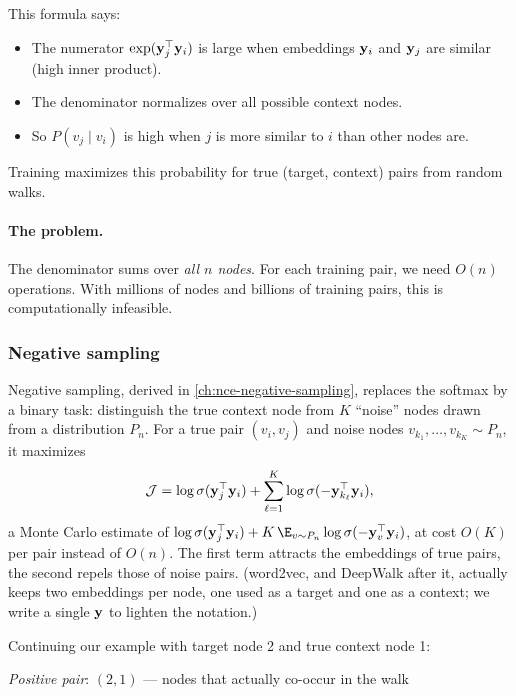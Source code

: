 \begin{notechapter}
\begin{intuition}
This formula says:
\begin{itemize}
    \item The numerator $\exp(\mathbf{y}_j^\top \mathbf{y}_i)$ is large when embeddings $\mathbf{y}_i$ and $\mathbf{y}_j$ are similar (high inner product).
    \item The denominator normalizes over all possible context nodes.
    \item So $P(v_j \mid v_i)$ is high when $j$ is more similar to $i$ than other nodes are.
\end{itemize}
Training maximizes this probability for true (target, context) pairs from random walks.
\end{intuition}

\paragraph{The problem.} The denominator sums over \emph{all $n$ nodes}. For each training pair, we need $O(n)$ operations. With millions of nodes and billions of training pairs, this is computationally infeasible.

\subsubsection*{Negative sampling}

Negative sampling, derived in \cref{ch:nce-negative-sampling}, replaces the softmax by a binary task: distinguish the true context node from $K$ ``noise'' nodes drawn from a distribution $P_n$. For a true pair $(v_i, v_j)$ and noise nodes $v_{k_1}, \ldots, v_{k_K} \sim P_n$, it maximizes
\[
\mathcal{J} = \log \sigma(\mathbf{y}_j^\top \mathbf{y}_i) + \sum_{\ell=1}^{K} \log \sigma(-\mathbf{y}_{k_\ell}^\top \mathbf{y}_i),
\]
a Monte Carlo estimate of $\log\sigma(\vect y_j^\top\vect y_i) + K\,\E_{v\sim P_n}\log\sigma(-\vect y_v^\top\vect y_i)$, at cost $O(K)$ per pair instead of $O(n)$. The first term attracts the embeddings of true pairs, the second repels those of noise pairs. (word2vec, and DeepWalk after it, actually keeps two embeddings per node, one used as a target and one as a context; we write a single $\mathbf{y}$ to lighten the notation.)

\begin{example}
Continuing our example with target node 2 and true context node 1:

\emph{Positive pair}: $(2, 1)$ --- nodes that actually co-occur in the walk


\end{example}
\end{notechapter}
